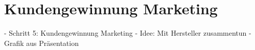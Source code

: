 \section{Kundengewinnung Marketing}

	- Schritt 5: Kundengewinnung Marketing
		- Idee: Mit Hersteller zusammentun
		- Grafik aus Präsentation